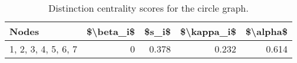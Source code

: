 \begin{table}
\centering
\caption{\label{tab:circle}Distinction centrality scores for the circle graph.}
\centering
\begin{tabular}[t]{lrrrr}
\toprule
Nodes & \$\textbackslash{}beta\_i\$ & \$s\_i\$ & \$\textbackslash{}kappa\_i\$ & \$\textbackslash{}alpha\$\\
\midrule
1, 2, 3, 4, 5, 6, 7 & 0 & 0.378 & 0.232 & 0.614\\
\bottomrule
\end{tabular}
\end{table}
